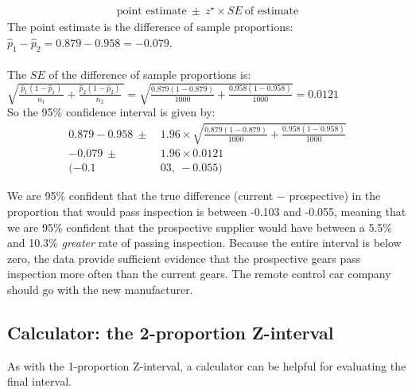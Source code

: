 \begin{examplewrap}
\begin{nexample}
\begin{description}
\begin{align*}
\text{point estimate}\ \pm\ z^{\star} \times SE\ \text{of estimate}
\end{align*}
The point estimate is the difference of sample proportions: $\hat{p}_1-\hat{p}_2 = 0.879 - 0.958 = -0.079$. \\ 
\\
The $SE$ of the difference of sample proportions is:  \\
$\sqrt{\frac{\ \hat{p}_1(1-\hat{p}_1)\ }{n_1}+ \frac{\hat{p}_2(1-\hat{p}_2)}{n_2}\ } = \sqrt{\frac{0.879(1-0.879)}{1000} +\frac{0.958(1-0.958)}{1000}}= 0.0121$ \\

So the 95\% confidence interval is given by:
\begin{align*}
0.879 - 0.958 \ \pm \ &1.96 \times  \sqrt{\frac{0.879(1-0.879)}{1000} +\frac{0.958(1-0.958)}{1000}}\\
-0.079\ \pm\ &1.96 \times 0.0121 \\
(-0.1&03,\ -0.055)
\end{align*}

\item[\inferencestep{Conclude}]  We are 95\% confident that the true difference (current $-$ prospective) in the proportion that would pass inspection is between -0.103 and -0.055, meaning that we are 95\% confident that the prospective supplier would have between a 5.5\% and 10.3\% \emph{greater} rate of passing inspection.  Because the entire interval is below zero, the data provide sufficient evidence that the prospective gears pass inspection more often than the current gears. The remote control car company should go with the new manufacturer.
\end{description}
\end{nexample}
\end{examplewrap}



\D{\newpage}

\subsection{Calculator: the 2-proportion Z-interval}
\label{2propZint}
As with the 1-proportion Z-interval, a calculator can be helpful for evaluating the final interval.

